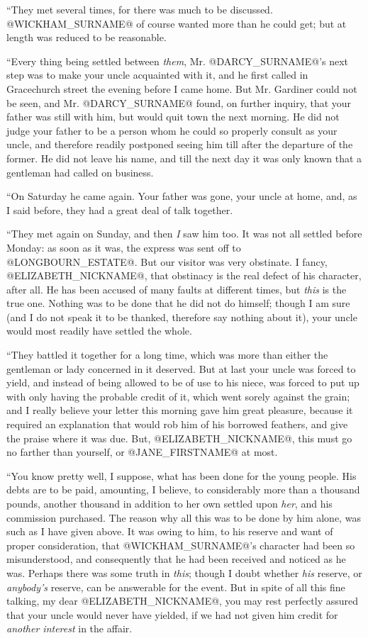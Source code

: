 ``They met several times, for there was much to be discussed. @WICKHAM_SURNAME@ of
course wanted more than he could get; but at length was reduced to be
reasonable.

``Every thing being settled between \textit{them}, Mr. @DARCY_SURNAME@'s next step was to
make your uncle acquainted with it, and he first called in Gracechurch
street the evening before I came home. But Mr. Gardiner could not be
seen, and Mr. @DARCY_SURNAME@ found, on further inquiry, that your father was
still with him, but would quit town the next morning. He did not judge
your father to be a person whom he could so properly consult as your
uncle, and therefore readily postponed seeing him till after the
departure of the former. He did not leave his name, and till the next
day it was only known that a gentleman had called on business.

``On Saturday he came again. Your father was gone, your uncle at home,
and, as I said before, they had a great deal of talk together.

``They met again on Sunday, and then \textit{I} saw him too. It was not all
settled before Monday: as soon as it was, the express was sent off to
@LONGBOURN_ESTATE@. But our visitor was very obstinate. I fancy, @ELIZABETH_NICKNAME@, that
obstinacy is the real defect of his character, after all. He has been
accused of many faults at different times, but \textit{this} is the true one.
Nothing was to be done that he did not do himself; though I am sure (and
I do not speak it to be thanked, therefore say nothing about it), your
uncle would most readily have settled the whole.

``They battled it together for a long time, which was more than either
the gentleman or lady concerned in it deserved. But at last your uncle
was forced to yield, and instead of being allowed to be of use to his
niece, was forced to put up with only having the probable credit of it,
which went sorely against the grain; and I really believe your letter
this morning gave him great pleasure, because it required an explanation
that would rob him of his borrowed feathers, and give the praise where
it was due. But, @ELIZABETH_NICKNAME@, this must go no farther than yourself, or @JANE_FIRSTNAME@
at most.

``You know pretty well, I suppose, what has been done for the young
people. His debts are to be paid, amounting, I believe, to considerably
more than a thousand pounds, another thousand in addition to her own
settled upon \textit{her}, and his commission purchased. The reason why all
this was to be done by him alone, was such as I have given above. It
was owing to him, to his reserve and want of proper consideration, that
@WICKHAM_SURNAME@'s character had been so misunderstood, and consequently that he
had been received and noticed as he was. Perhaps there was some truth
in \textit{this}; though I doubt whether \textit{his} reserve, or \textit{anybody's} reserve,
can be answerable for the event. But in spite of all this fine talking,
my dear @ELIZABETH_NICKNAME@, you may rest perfectly assured that your uncle would
never have yielded, if we had not given him credit for \textit{another
interest} in the affair.

